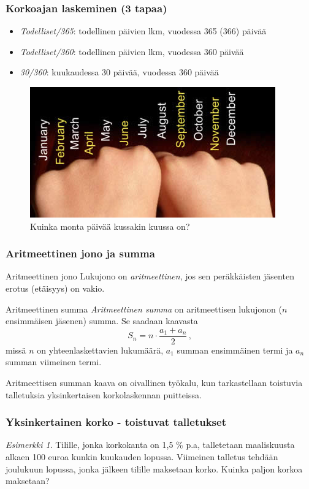 \documentclass{beamer}\usepackage[]{graphicx}\usepackage[]{color}
\theoremstyle{remark}
\newtheorem{esim}{Esimerkki}
\begin{document}
\begin{frame}
    \frametitle{Korkoajan laskeminen (3 tapaa)}
    \pause
    \begin{itemize}[<+->]
        \item \emph{Todelliset/365}: todellinen päivien lkm, vuodessa 365 (366) päivää
        \item \emph{Todelliset/360}: todellinen päivien lkm, vuodessa 360 päivää
        \item \emph{30/360}: kuukaudessa 30 päivää, vuodessa 360 päivää
    \end{itemize}
    \pause
    \begin{figure}
        \centering
        \includegraphics[scale=0.7]{months}
        \caption{Kuinka monta päivää kussakin kuussa on?}
    \end{figure}
\end{frame}
\begin{frame}
    \frametitle{Aritmeettinen jono ja summa}
    \begin{block}{Aritmeettinen jono}
        Lukujono \pause on \emph{aritmeettinen}, jos sen peräkkäisten jäsenten erotus (etäisyys) on vakio.
    \end{block}
    \pause
    \begin{block}{Aritmeettinen summa}
        \emph{Aritmeettinen summa} \pause on aritmeettisen lukujonon ($n$ ensimmäisen jäsenen) summa. \pause Se saadaan kaavasta
        \[
            S_n = n \cdot \frac{a_1 + a_n}{2}\,,
        \]
        \pause missä $n$ on yhteenlaskettavien lukumäärä, \pause $a_1$ summan ensimmäinen termi ja \pause $a_n$ summan viimeinen termi.
    \end{block}
    \pause
    Aritmeettisen summan kaava on oivallinen työkalu, kun tarkastellaan toistuvia talletuksia yksinkertaisen korkolaskennan puitteissa.
\end{frame}

\begin{frame}
    \frametitle{Yksinkertainen korko - toistuvat talletukset}
    \begin{esim}
        Tilille, jonka korkokanta on 1,5 \% p.a, talletetaan maaliskuusta alkaen 100 euroa kunkin kuukauden lopussa.
        Viimeinen talletus tehdään joulukuun lopussa, jonka jälkeen tilille maksetaan korko. Kuinka paljon korkoa maksetaan?
    \end{esim}
\end{frame}
\end{document}
